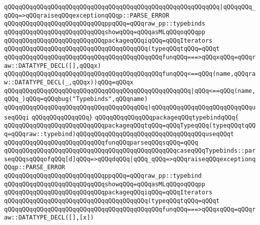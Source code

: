 \verb|qQQqqQQqqQQqqQQqqQQqqQQqqQQqqQQqqQQqqQQqqQQqqQQqqQQqqQQqqQQq|\verb#|qQQqqQQq_qQQq=>qQQqraiseqQQqexceptionqQQqp::PARSE_ERROR#\newline
\verb|qQQqqQQqqQQqqQQqqQQqqQQqqQQqppqQQq=qQQqraw_pp::typebinds|\newline
\verb|qQQqqQQqqQQqqQQqqQQqqQQqqQQqshowqQQq=qQQqasMLqQQqoqQQqpp|\newline
\verb|qQQqqQQqqQQqqQQqqQQqqQQqqQQqpackageqQQqiqQQq=qQQqIterators|\newline
\verb|qQQqqQQqqQQqqQQqqQQqqQQqqQQqqQQqqQQqqQQq(typeqQQqtqQQq=qQQqt|\newline
\verb|qQQqqQQqqQQqqQQqqQQqqQQqqQQqqQQqqQQqqQQqqQQqfunqQQq===>qQQqxqQQq=qQQqraw::DATATYPE_DECL([],qQQqx)|\newline
\verb|qQQqqQQqqQQqqQQqqQQqqQQqqQQqqQQqqQQqqQQqqQQqfunqQQq<==qQQq(name,qQQqraw::DATATYPE_DECL(_,qQQqx))qQQq=qQQqx|\newline
\verb|qQQqqQQqqQQqqQQqqQQqqQQqqQQqqQQqqQQqqQQqqQQqqQQqqQQq|\verb#|qQQq<==qQQq(name,qQQq_)qQQq=qQQqbug("Typebinds",qQQqname)#\newline
\verb|qQQqqQQqqQQqqQQqqQQqqQQqqQQqqQQqqQQqqQQq)qQQqqQQqqQQqqQQqqQQqqQQqqQQquseqQQqi|\newline
\verb|qQQqqQQqqQQqqQQq}|\newline
\newline
\verb|qQQqqQQqqQQqqQQqpackageqQQqtypebindqQQq{|\newline
\newline
\verb|qQQqqQQqqQQqqQQqqQQqqQQqqQQqpackageqQQqtqQQq=qQQqTypeqQQq(typeqQQqtqQQq=qQQqraw::typebind)qQQqqQQqqQQqqQQqqQQqqQQqqQQqqQQqqQQquseqQQqt|\newline
\verb|qQQqqQQqqQQqqQQqqQQqqQQqqQQqfunqQQqparseqQQqsqQQq=qQQq|\newline
\verb|qQQqqQQqqQQqqQQqqQQqqQQqqQQqqQQqqQQqqQQqqQQqqQQqcaseqQQqTypebinds::parseqQQqsqQQqofqQQq[d]qQQq=>qQQqdqQQq|\verb#|qQQq_qQQq=>qQQqraiseqQQqexceptionqQQqp::PARSE_ERROR#\newline
\verb|qQQqqQQqqQQqqQQqqQQqqQQqqQQqppqQQq=qQQqraw_pp::typebind|\newline
\verb|qQQqqQQqqQQqqQQqqQQqqQQqqQQqshowqQQq=qQQqasMLqQQqoqQQqpp|\newline
\verb|qQQqqQQqqQQqqQQqqQQqqQQqqQQqpackageqQQqiqQQq=qQQqIterators|\newline
\verb|qQQqqQQqqQQqqQQqqQQqqQQqqQQqqQQqqQQqqQQq(typeqQQqtqQQq=qQQqt|\newline
\verb|qQQqqQQqqQQqqQQqqQQqqQQqqQQqqQQqqQQqqQQqqQQqfunqQQq===>qQQqxqQQq=qQQqraw::DATATYPE_DECL([],[x])|\newline
